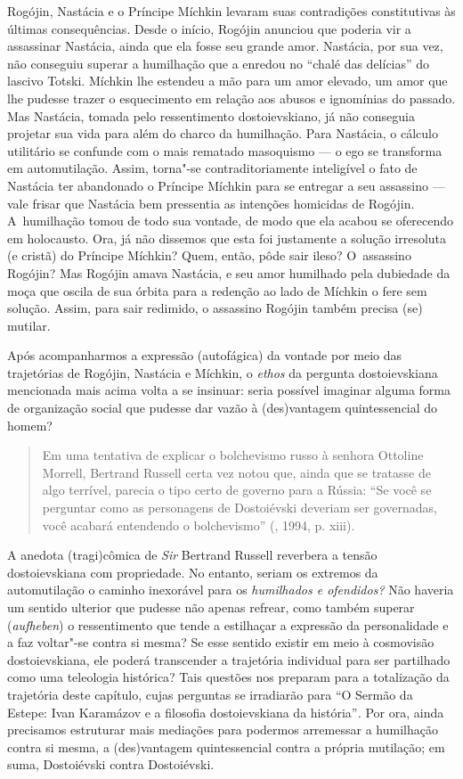 Rogójin, Nastácia e o Príncipe Míchkin levaram suas contradições
constitutivas às últimas consequências. Desde o início, Rogójin anunciou
que poderia vir a assassinar Nastácia, ainda que ela fosse seu grande
amor. Nastácia, por sua vez, não conseguiu superar a humilhação que a
enredou no ``chalé das delícias'' do lascivo Totski. Míchkin lhe
estendeu a mão para um amor elevado, um amor que lhe pudesse trazer o
esquecimento em relação aos abusos e ignomínias do passado. Mas
Nastácia, tomada pelo ressentimento dostoievskiano, já não conseguia
projetar sua vida para além do charco da humilhação. Para Nastácia, o
cálculo utilitário se confunde com o mais rematado masoquismo --- o ego
se transforma em automutilação. Assim, torna"-se contraditoriamente
inteligível o fato de Nastácia ter abandonado o Príncipe Míchkin para se
entregar a seu assassino --- vale frisar que Nastácia bem pressentia as
intenções homicidas de Rogójin. A~humilhação tomou de todo sua vontade,
de modo que ela acabou se oferecendo em holocausto. Ora, já não dissemos
que esta foi justamente a solução irresoluta (e cristã) do Príncipe
Míchkin? Quem, então, pôde sair ileso? O~assassino Rogójin? Mas Rogójin
amava Nastácia, e seu amor humilhado pela dubiedade da moça que oscila
de sua órbita para a redenção ao lado de Míchkin o fere sem solução.
Assim, para sair redimido, o assassino Rogójin também precisa (se)
mutilar.

Após acompanharmos a expressão (autofágica) da vontade por meio das
trajetórias de Rogójin, Nastácia e Míchkin, o \emph{ethos} da pergunta
dostoievskiana mencionada mais acima volta a se insinuar: seria possível
imaginar alguma forma de organização social que pudesse dar vazão à
(des)vantagem quintessencial do homem?

\begin{quote}
Em uma tentativa de explicar o bolchevismo russo à senhora Ottoline
Morrell, Bertrand Russell certa vez notou que, ainda que se tratasse de
algo terrível, parecia o tipo certo de governo para a Rússia: ``Se você
se perguntar como as personagens de Dostoiévski deveriam ser governadas,
você acabará entendendo o bolchevismo'' (, 1994, p. xiii).
\end{quote}

A anedota (tragi)cômica de \emph{Sir} Bertrand Russell reverbera a
tensão dostoievskiana com propriedade. No entanto, seriam os extremos da
automutilação o caminho inexorável para os \emph{humilhados e
ofendidos?} Não haveria um sentido ulterior que pudesse não apenas
refrear, como também superar (\emph{aufheben}) o ressentimento que tende
a estilhaçar a expressão da personalidade e a faz voltar"-se contra si
mesma? Se esse sentido existir em meio à cosmovisão dostoievskiana, ele
poderá transcender a trajetória individual para ser partilhado como uma
teleologia histórica? Tais questões nos preparam para a totalização da
trajetória deste capítulo, cujas perguntas se irradiarão para ``O Sermão
da Estepe: Ivan Karamázov e a filosofia dostoievskiana da
história''\emph{.} Por ora, ainda precisamos estruturar mais mediações
para podermos arremessar a humilhação contra si mesma, a (des)vantagem
quintessencial contra a própria mutilação; em suma, Dostoiévski contra
Dostoiévski.

